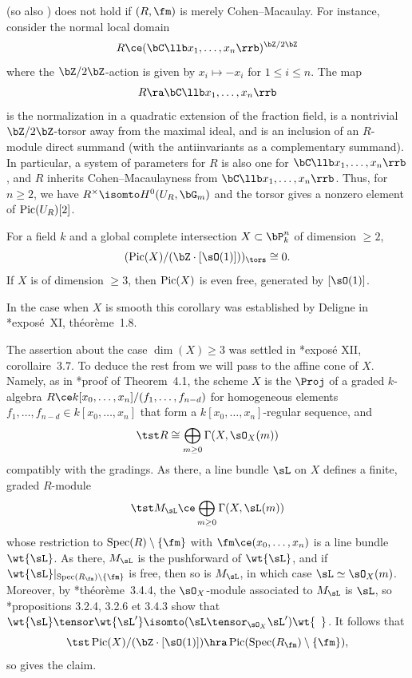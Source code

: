 \brem \label{no-free-lunch}
 (so also ) does not hold if $(R, \fm)$ is merely Cohen--Macaulay. For instance, consider the normal local domain
\[
R \ce (\bC\llb x_1, \dotsc, x_n\rrb)^{\bZ/2\bZ}
\]
where the $\bZ/2\bZ$-action is given by $x_i \mapsto -x_i$ for $1 \le i \le n$.
The map
\[
R \ra \bC\llb x_1, \dotsc, x_n\rrb
\]
is the normalization in a quadratic extension of the fraction field, is a nontrivial $\bZ/2\bZ$-torsor away from the maximal ideal, and is an inclusion of an $R$-module direct summand (with the antiinvariants as a complementary summand). In particular, a system of parameters for $R$ is also one for $\bC\llb x_1, \dotsc, x_n\rrb$, and $R$ inherits Cohen--Macaulayness from $\bC\llb x_1, \dotsc, x_n\rrb$.
Thus, for $n \ge 2$, we have $R^\times \isomto H^0(U_R, \bG_m)$ and the torsor gives a nonzero element of $\operatorname{Pic}(U_R)[2]$.
\erem


\bcor \label{global-ci-cor}
For a field $k$ and a global complete intersection $X \subset \bP^n_k$ of dimension $\ge 2$,
\[
(\Pic(X)/(\bZ \cdot [\sO(1)]))_\tors \cong 0.
\]
If $X$ is of dimension $\ge 3$, then $\operatorname{Pic}(X)$ is even free, generated by $[\sO(1)]$.
\ecor

In the case when $X$ is smooth this corollary was established by Deligne in \cite{SGA7II}*{expos\'{e}~XI, th\'{e}or\`{e}me~1.8}.

\bpf
The assertion about the case $\dim(X) \ge 3$ was settled in \cite{SGA2new}*{expos\'{e} XII, corollaire~3.7}.
To deduce the rest from  we will pass to the affine cone of $X$. Namely, as in \cite{Grothendieck-Lefschetz}*{proof of Theorem~4.1}, the scheme $X$ is the $\Proj$ of a graded $k$-algebra $R\ce k[x_0, \dotsc, x_n]/(f_1, \dotsc, f_{n - d})$ for homogeneous elements $f_1, \dotsc, f_{n - d} \in k[x_0, \dotsc, x_n]$ that form a $k[x_0, \dotsc, x_n]$-regular sequence, and
\[
\tst R \cong \bigoplus_{m \ge 0} \Gamma(X, \sO_X(m))
\]
compatibly with the gradings. As there, a line bundle $\sL$ on $X$ defines a finite, graded $R$-module
\[
\tst M_\sL \ce \bigoplus_{m \ge 0} \Gamma(X, \sL(m))
\]
whose restriction to $\Spec(R) \setminus \{ \fm\}$ with $\fm \ce (x_0, \dotsc, x_n)$ is a line bundle $\wt{\sL}$. As there, $M_\sL$ is the pushforward of $\wt{\sL}$, and if $\wt{\sL}|_{\Spec(R_\fm)\setminus \{\fm\}}$ is free, then so is $M_\sL$, %
in which case $\sL \simeq \sO_X(m)$. Moreover, by \cite{EGAII}*{th\'{e}or\`{e}me~3.4.4}, the $\sO_X$-module associated to $M_\sL$ is $\sL$, so \cite{EGAII}*{propositions 3.2.4, 3.2.6 et 3.4.3} show that $\wt{\sL} \tensor \wt{\sL'} \isomto (\sL \tensor_{\sO_X} \sL')\wt{\ \,}$. It follows that
\[
\tst \Pic(X)/(\bZ \cdot [\sO(1)]) \hra \Pic(\Spec(R_\fm) \setminus \{ \fm\}),
\]
so  gives the claim.
\epf



